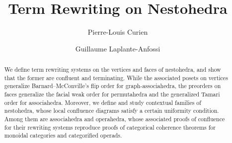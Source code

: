 \documentclass{svproc}
\newcommand{\0}{\color{blue}{\mathsf{0}}}
\begin{document}
\mainmatter              %
%
\title{Term Rewriting on Nestohedra}
%
%
\author{Pierre-Louis Curien \and Guillaume Laplante-Anfossi}
%
%
%

\maketitle              %

\begin{abstract}
  We define term rewriting systems on the vertices and faces of nestohedra, and show that the former are  
  confluent and terminating. 
  While the associated posets on vertices generalize Barnard--McConville's flip order for graph-associahedra, the preorders on faces generalize the facial weak order for permutahedra and the generalized Tamari order for associahedra. 
  Moreover, we define and study contextual families of nestohedra, whose local confluence diagrams satisfy a certain uniformity condition. 
  Among them are associahedra and operahedra, whose associated proofs of confluence for their rewriting systems reproduce proofs of categorical coherence theorems for monoidal categories and categorified operads.
\end{abstract}







%
%



\end{document}

